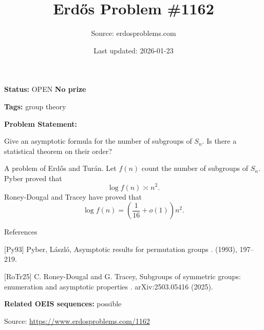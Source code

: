 \documentclass{article}
\title{Erd\H{o}s Problem \#1162}
\date{Last updated: 2026-01-23}
\author{Source: erdosproblems.com}
\begin{document}
\maketitle

\noindent\textbf{Status:} OPEN \quad \textbf{No prize}

\noindent\textbf{Tags:} group theory

\medskip

\noindent\textbf{Problem Statement:}

Give an asymptotic formula for the number of subgroups of $S_n$. Is there a statistical theorem on their order?




A problem of Erd\H{o}s and Tur\'{a}n. Let $f(n)$ count the number of subgroups of $S_n$. Pyber \cite{Py93} proved that\[\log f(n) \asymp n^2.\]Roney-Dougal and Tracey \cite{RoTr25} have proved that\[\log f(n)=\left(\frac{1}{16}+o(1)\right)n^2.\]




References

[Py93] Pyber, L\'{a}szl\'o, Asymptotic results for permutation groups . (1993), 197--219.

[RoTr25] C. Roney-Dougal and G. Tracey, Subgroups of symmetric groups: enumeration and asymptotic properties . arXiv:2503.05416 (2025).

\noindent\textbf{Related OEIS sequences:} possible


\bigskip
\noindent\small{Source: \url{https://www.erdosproblems.com/1162}}
\end{document}
